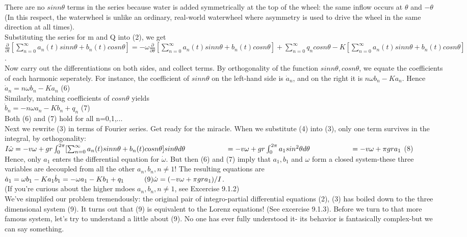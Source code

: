 \documentclass{article}
\newcommand\tab[1][1cm]{\hspace*{#1}}
\begin{document}
There are no $sin n \theta$ terms in the series because water is added symmetrically at the top of the wheel: the same inflow occurs at $\theta$ and $-\theta$ (In this respect, the waterwheel is unlike an ordinary, real-world waterwheel where asymmetry is used to drive the wheel in the same direction at all times). \\ \tab
Substituting the series for m and Q into (2), we get \\ 
$\frac{\partial}{\partial t}[\sum_{n=0}^{\infty}a_{n}(t)sin n \theta + b_{n}(t)cosn \theta] = -\omega \frac{\partial}{\partial \theta} [\sum_{n=0}^{\infty} a_{n}(t) sin n \theta + b_{n}(t)cos n \theta] + \sum_{n=0}^{\infty} q_{n}cos n \theta - K[\sum_{n=0}^{\infty}a_{n}(t) sin n \theta + b_{n}(t) cos n \theta]$. \\
Now carry out the differentiations on both sides, and collect terms. By orthogonality of the function $sin n \theta, cos n \theta$, we equate the coefficients of each harmonic seperately. For instance, the coefficient of $sin n \theta$ on the left-hand side is $\dot{a}_{n}$, and on the right it is $n \omega b_{n}-Ka_{n}$. Hence \\
\tab \tab
$\dot{a}_{n}=n \omega b_{n}-Ka_{n}$ \tab (6) \\
Similarly, matching coefficients of $cos n \theta$ yields \\ \tab \tab
$\dot{b}_{n}=-n\omega a_{n}-Kb_{n}+q_{n}$ \tab (7) \\
Both (6) and (7) hold for all n=0,1,... \\ \tab
Next we rewrite (3) in terms of Fourier series. Get ready for the miracle. When we substitute (4) into (3), only one term survives in the integral, by orthogonality: \\ \tab \tab
$I\dot{\omega}=-v\omega + gr \int_{0}^{2\pi}[\sum_{n=0}^{\infty}a_{n}(t)sin n \theta + b_{n}(t) cos n \theta ] sin \theta d \theta \\
\tab \tab = -v\omega + gr \int_{0}^{2\pi}a_{1}sin^{2}\theta d\theta \\ \tab \tab
= -v\omega +\pi gra_{1}$ \tab (8) \\
Hence, only $a_{1}$ enters the differential equation for $\dot{\omega}$. But then (6) and (7) imply that $a_{1}, b_{1}$ and $\omega$ form a closed system-these three variables are decoupled from all the other $a_{n}, b_{n}, n \neq 1$! The resulting equations are \\ \tab \tab
$\dot{a}_{1}=\omega b_{1}-Ka_{1} \\
\dot{b}_{1}=-\omega a_{1}-Kb_{1}+q_{1} \tab (9) \\
\dot{\omega}=(-v \omega + \pi gra_{1})/I$. \\
(If you're curious about the higher mdoes $a_{n}, b_{n}, n \neq 1$, see Excercise 9.1.2) \\ \tab We've simplifed our problem tremendously: the original pair of integro-partial differential equations (2), (3) has boiled down to the three dimensional system (9). It turns out that (9) is equivalent to the Lorenz equations! (See excercise 9.1.3). Before we turn to that more famous system, let's try to understand a little about (9). No one has ever fully understood it- its behavior is fantasically complex-but we can say something. 
\end{document}
